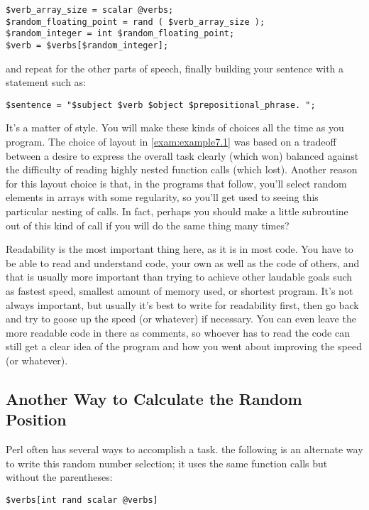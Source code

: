 \begin{lstlisting}
$verb_array_size = scalar @verbs;
$random_floating_point = rand ( $verb_array_size );
$random_integer = int $random_floating_point;
$verb = $verbs[$random_integer];
\end{lstlisting}

and repeat for the other parts of speech, finally building your sentence with a statement such as:

\begin{lstlisting}
$sentence = "$subject $verb $object $prepositional_phrase. ";
\end{lstlisting}

It's a matter of style. You will make these kinds of choices all the time as you program. The choice of layout in \autoref{exam:example7.1} was based on a tradeoff between a desire to express the overall task clearly (which won) balanced against the difficulty of reading highly nested function calls (which lost). Another reason for this layout choice is that, in the programs that follow, you'll select random elements in arrays with some regularity, so you'll get used to seeing this particular nesting of calls. In fact, perhaps you should make a little subroutine out of this kind of call if you will do the same thing many times?

Readability is the most important thing here, as it is in most code. You have to be able to read and understand code, your own as well as the code of others, and that is usually more important than trying to achieve other laudable goals such as fastest speed, smallest amount of memory used, or shortest program. It's not always important, but usually it's best to write for readability first, then go back and try to goose up the speed (or whatever) if necessary. You can even leave the more readable code in there as comments, so whoever has to read the code can still get a clear idea of the program and how you went about improving the speed (or whatever). 

\subsection{Another Way to Calculate the Random Position}
Perl often has several ways to accomplish a task. the following is an alternate way to write this random number selection; it uses the same function calls but without the parentheses:

\begin{lstlisting}
$verbs[int rand scalar @verbs]
\end{lstlisting}

